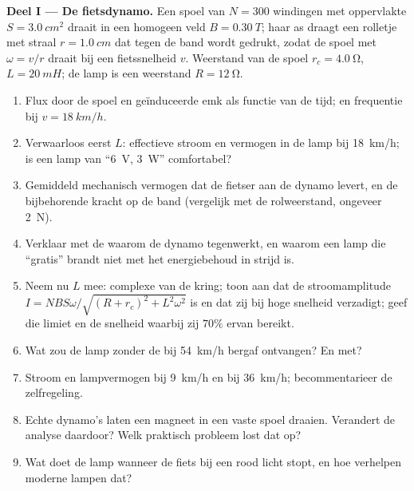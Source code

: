 \begin{problem}
\medskip
\noindent\textbf{Deel I --- De fietsdynamo.}
Een spoel van $N = 300$ windingen met oppervlakte $S = \qty{3.0}{cm^2}$ draait in een
homogeen veld $B = \qty{0.30}{T}$; haar as draagt een rolletje met straal
$r = \qty{1.0}{cm}$ dat tegen de band wordt gedrukt, zodat de spoel met
$\omega = v/r$ draait bij een fietssnelheid $v$. Weerstand van de spoel $r_c = \qty{4.0}{\ohm}$,
 $L = \qty{20}{mH}$; de lamp is een weerstand $R = \qty{12}{\ohm}$.
\begin{enumerate}
  \item Flux door de spoel en geïnduceerde emk als functie van de tijd;
         en frequentie bij $v = \qty{18}{km/h}$.
  \item Verwaarloos eerst $L$: effectieve stroom en vermogen in de lamp bij
        \qty{18}{km/h}; is een lamp van ``\qty{6}{V}, \qty{3}{W}'' comfortabel?
  \item Gemiddeld mechanisch vermogen dat de fietser aan de dynamo levert, en
        de bijbehorende kracht op de band (vergelijk met de rolweerstand,
        ongeveer \qty{2}{N}).
  \item Verklaar met de  waarom de dynamo tegenwerkt, en waarom een lamp
        die ``gratis'' brandt niet met het energiebehoud in strijd is.
  \item Neem nu $L$ mee: complexe  van de kring; toon aan dat
        de stroomamplitude $I = NBS\omega/\sqrt{(R + r_c)^2 + L^2\omega^2}$ is
        en dat zij bij hoge snelheid verzadigt; geef die limiet en de
        snelheid waarbij zij $70\%$ ervan bereikt.
  \item Wat zou de lamp zonder de  bij
        \qty{54}{km/h} bergaf ontvangen? En met?
  \item Stroom en lampvermogen bij \qty{9}{km/h} en bij \qty{36}{km/h}; becommentarieer
        de zelfregeling.
  \item Echte dynamo's laten een magneet in een vaste spoel draaien. Verandert de
        analyse daardoor? Welk praktisch probleem lost dat op?
  \item Wat doet de lamp wanneer de fiets bij een rood licht stopt,
        en hoe verhelpen moderne lampen dat?
\end{enumerate}


\end{problem}
